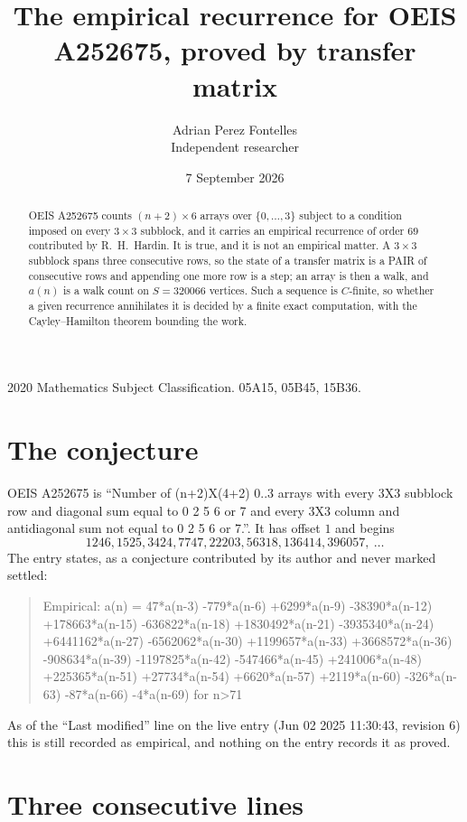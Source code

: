 \documentclass[11pt,a4paper]{article}
\title{The empirical recurrence for OEIS A252675, proved by transfer matrix}
\author{Adrian Perez Fontelles\\ \small Independent researcher}
\date{7 September 2026}
\theoremstyle{plain}
\theoremstyle{definition}
\begin{document}
\maketitle

\begin{abstract}
OEIS A252675 counts $(n+2)\times6$ arrays over $\{0,\dots,3\}$ subject to a condition imposed on
every $3\times3$ subblock, and it carries an empirical recurrence of order $69$
contributed by R.~H.~Hardin. It is true, and it is not an empirical matter. A $3\times3$
subblock spans three consecutive rows, so the state of a transfer matrix is a PAIR of
consecutive rows and appending one more row is a step; an array is then a walk, and
$a(n)$ is a walk count on $S=320066$ vertices. Such a sequence is $C$-finite, so whether a given
recurrence annihilates it is decided by a finite exact computation, with the Cayley--Hamilton
theorem bounding the work.
\end{abstract}

\noindent\small 2020 Mathematics Subject Classification. 05A15, 05B45, 15B36.\normalsize

\section{The conjecture}

OEIS A252675 is ``Number of (n+2)X(4+2) 0..3 arrays with every 3X3 subblock row and diagonal sum equal to 0 2 5 6 or 7 and every 3X3 column and antidiagonal sum not equal to 0 2 5 6 or 7.''. It has offset $1$ and begins
\[
1246, 1525, 3424, 7747, 22203, 56318, 136414, 396057,\ \dots
\]
The entry states, as a conjecture contributed by its author and never marked settled:
\begin{quote}
Empirical: a(n) = 47*a(n-3) -779*a(n-6) +6299*a(n-9) -38390*a(n-12) +178663*a(n-15) -636822*a(n-18) +1830492*a(n-21) -3935340*a(n-24) +6441162*a(n-27) -6562062*a(n-30) +1199657*a(n-33) +3668572*a(n-36) -908634*a(n-39) -1197825*a(n-42) -547466*a(n-45) +241006*a(n-48) +225365*a(n-51) +27734*a(n-54) +6620*a(n-57) +2119*a(n-60) -326*a(n-63) -87*a(n-66) -4*a(n-69) for n>71
\end{quote}
As of the ``Last modified'' line on the live entry (Jun 02 2025 11:30:43, revision 6) this is still
recorded as empirical, and nothing on the entry records it as proved.

\section{Three consecutive lines}
\end{document}
